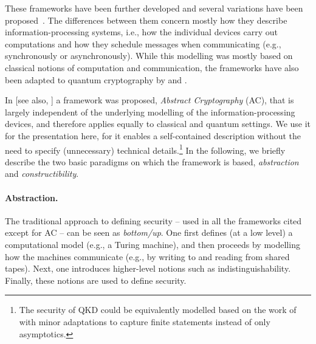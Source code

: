 These frameworks have been further developed \cite{BPW04,BPW07,CDPW07,Can20} and several variations have been
proposed~\cite{MMS03,MRST06,CCKLLPS06a,CCKLLPS06b,Kus06,HS13}. The differences between them concern mostly how they describe information-processing systems, i.e., how the individual devices carry out computations and how they schedule messages when communicating (e.g., synchronously or asynchronously).  While this modelling was mostly based on classical notions of computation and communication, the frameworks have also been adapted to quantum cryptography by
\textcite{BM04} and \textcite{Unr04,Unr10}. 

In \textcite{MR11} [see also, \textcite{Mau12,MR16}] a framework was
proposed, \emph{Abstract Cryptography} (AC), that is largely
independent of the underlying modelling of the information-processing
devices, and therefore applies equally to classical and quantum
settings. We use it for the presentation here, for it enables a
self-contained description without the need to specify (unnecessary)
technical details.\footnote{The security of QKD could be equivalently
  modelled based on the work of \textcite{Unr10} with minor
  adaptations to capture finite statements instead of only
  asymptotics.}
In the following, we briefly describe the two basic paradigms on which
the framework is based, \emph{abstraction} and
\emph{constructibility}.

\paragraph{Abstraction.}
The traditional approach to defining security \--- used in all the
frameworks cited except for AC \--- can be seen as \emph{bottom\-/up}. One
first defines (at a low level) a computational model (e.g., a Turing
machine), and then proceeds by modelling how the machines communicate (e.g., by
writing to and reading from shared tapes). Next, one introduces higher-level notions such as indistinguishability. Finally, these notions are used to define security. 

